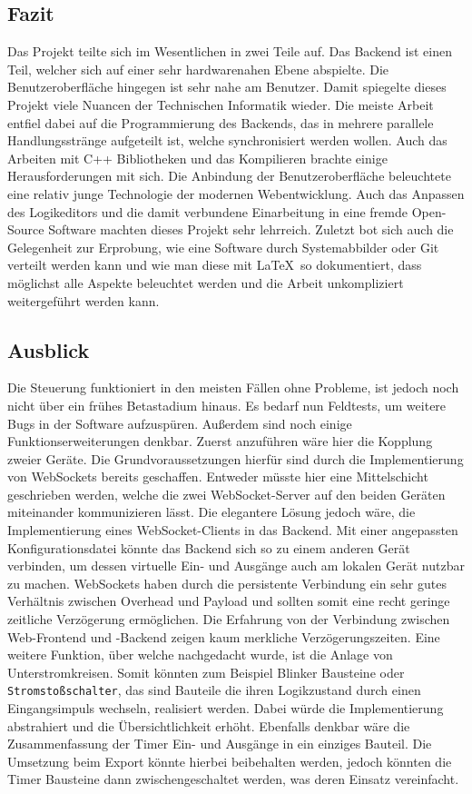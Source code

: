  \subsection{Fazit}
 Das Projekt teilte sich im Wesentlichen in zwei Teile auf. Das Backend ist einen Teil, welcher sich auf einer sehr hardwarenahen Ebene abspielte. Die Benutzeroberfläche hingegen ist sehr nahe am Benutzer. Damit spiegelte dieses Projekt viele Nuancen der Technischen Informatik wieder. Die meiste Arbeit entfiel dabei auf die Programmierung des Backends, das in mehrere parallele Handlungsstränge aufgeteilt ist, welche synchronisiert werden wollen. Auch das Arbeiten mit C++ Bibliotheken und das Kompilieren brachte einige Herausforderungen mit sich. Die Anbindung der Benutzeroberfläche beleuchtete eine relativ junge Technologie der modernen Webentwicklung. Auch das Anpassen des Logikeditors und die damit verbundene Einarbeitung in eine fremde Open-Source Software machten dieses Projekt sehr lehrreich. Zuletzt bot sich auch die Gelegenheit zur Erprobung, wie eine Software durch Systemabbilder oder Git verteilt werden kann und wie man diese mit \LaTeX\ so dokumentiert, dass möglichst alle Aspekte beleuchtet werden und die Arbeit unkompliziert weitergeführt werden kann.
 
 \subsection{Ausblick}
 Die Steuerung funktioniert in den meisten Fällen ohne Probleme, ist jedoch noch nicht über ein frühes Betastadium hinaus. Es bedarf nun Feldtests, um weitere Bugs in der Software aufzuspüren. Außerdem sind noch einige Funktionserweiterungen denkbar. Zuerst anzuführen wäre hier die Kopplung zweier Geräte. Die Grundvoraussetzungen hierfür sind durch die Implementierung von WebSockets bereits geschaffen. Entweder müsste hier eine Mittelschicht geschrieben werden, welche die zwei WebSocket-Server auf den beiden Geräten miteinander kommunizieren lässt. Die elegantere Lösung jedoch wäre, die Implementierung eines WebSocket-Clients in das Backend. Mit einer angepassten Konfigurationsdatei könnte das Backend sich so zu einem anderen Gerät verbinden, um dessen virtuelle Ein- und Ausgänge auch am lokalen Gerät nutzbar zu machen. WebSockets haben durch die persistente Verbindung ein sehr gutes Verhältnis zwischen Overhead und Payload und sollten somit eine recht geringe zeitliche Verzögerung ermöglichen. Die Erfahrung von der Verbindung zwischen Web-Frontend und -Backend zeigen kaum merkliche Verzögerungszeiten. Eine weitere Funktion, über welche nachgedacht wurde, ist die Anlage von Unterstromkreisen. Somit könnten zum Beispiel Blinker Bausteine oder \texttt{Stromstoßschalter}, das sind Bauteile die ihren Logikzustand durch einen Eingangsimpuls wechseln, realisiert werden. Dabei würde die Implementierung abstrahiert und die Übersichtlichkeit erhöht. Ebenfalls denkbar wäre die Zusammenfassung der Timer Ein- und Ausgänge in ein einziges Bauteil. Die Umsetzung beim Export könnte hierbei beibehalten werden, jedoch könnten die Timer Bausteine dann zwischengeschaltet werden, was deren Einsatz vereinfacht. 
  

 
 
\clearpage